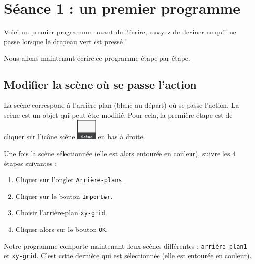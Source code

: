 


%
%
%
%





\section{Séance 1 : un premier programme}

Voici un premier programme : avant de l'écrire, essayez de deviner ce qu'il se passe lorsque le drapeau vert est pressé !



Nous allons maintenant écrire ce programme étape par étape.


\subsection{Modifier la scène où se passe l'action}

La scène correspond à l'arrière-plan (blanc au départ) où se passe l'action. La scène est un objet qui peut être modifié. Pour cela, la première étape est de cliquer sur l'icône scène \includegraphics[width=1cm]{./images/scratch/Scene} en bas à droite.


Une fois la scène sélectionnée (elle est alors entourée en couleur), suivre les 4 étapes suivantes :

\begin{enumerate}
\item Cliquer sur l'onglet \texttt{Arrière-plans}.
\item Cliquer sur le bouton \texttt{Importer}.
\item Choisir l'arrière-plan \texttt{xy-grid}.
\item Cliquer alors sur le bouton \texttt{OK}. 
\end{enumerate}



Notre programme comporte maintenant deux scènes différentes : \texttt{arrière-plan1} et \texttt{xy-grid}. C'est cette dernière qui est sélectionnée (elle est entourée en couleur).

